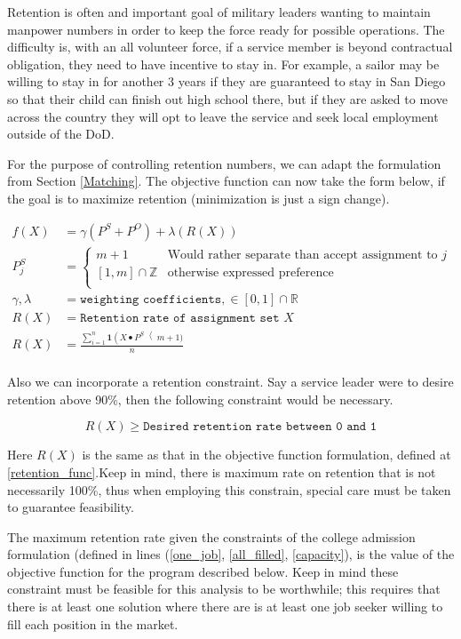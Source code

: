 Retention is often and important goal of military leaders wanting to maintain manpower numbers in order to keep the force ready for possible operations. The difficulty is, with an all volunteer force, if a service member is beyond contractual obligation, they need to have incentive to stay in. For example, a sailor may be willing to stay in for another 3 years if they are guaranteed to stay in San Diego so that their child can finish out high school there, but if they are asked to move across the country they will opt to leave the service and seek local employment outside of the DoD. 

For the purpose of controlling retention numbers, we can adapt the formulation from Section \ref{Matching}. The objective function can now take the form below, if the goal is to maximize retention (minimization is just a sign change).

\begin{align}
f(X) &= \gamma(P^S + P^O) + \lambda (R(X)) \\
P^S_j &= \begin{cases}
m + 1 &  \text{Would rather separate than accept assignment to } j \\
[1,m] \cap \mathbb{Z}  &  \text{otherwise expressed preference} \\
\end{cases} \\ 
\gamma, \lambda &= \texttt{weighting coefficients}, \in [0,1] \cap \mathbb{R} \\
R(X) &= \texttt{Retention rate of assignment set }X \\
R(X) &= \frac{\sum_{i=1}^n \mathbf{1}\left(X\bullet P^S\right < m+1)}{n} \label{retention_func}\\
\end{align}

Also we can incorporate a retention constraint. Say a service leader were to desire retention above 90\%, then the following constraint would be necessary. 

\[R(X) \geq \texttt{Desired retention rate between 0 and 1} \]

Here $R(X)$ is the same as that in the objective function formulation, defined at \ref{retention_func}.Keep in mind, there is maximum rate on retention that is not necessarily 100\%, thus when employing this constrain, special care must be taken to guarantee feasibility.  

The maximum retention rate given the constraints of the college admission formulation (defined in lines (\ref{one_job}, \ref{all_filled}, \ref{capacity}), is the value of the objective function for the program described below. Keep in mind these constraint must be feasible for this analysis to be worthwhile; this requires that there is at least one solution where there are is at least one job seeker willing to fill each position in the market.


